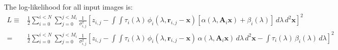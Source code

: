 \documentclass[DM,authoryear,toc]{lsstdoc}
\begin{document}
The log-likelihood for all input images is:
\begin{align}
L \equiv &
    \frac{1}{2} \sum_{i=0}^{i<N} \sum_{j=0}^{j<M_i}
        \frac{1}{\sigma_{i,j}^2}
        \left[
            z_{i,j}
            - \int\!\!\!\!\int\!
                \tau_i(\lambda)
                \, \phi_i(\lambda, \bm{r}_{i,j} - \bm{x})
                \left[
                    \alpha(\lambda, \bm{A}_i\bm{x})
                    + \beta_i(\lambda)
                \right]
                \, d\lambda \, d^2\bm{x}
        \right]^2 \\
=&
    \frac{1}{2} \sum_{i=0}^{i<N} \sum_{j=0}^{j<M_i}
        \frac{1}{\sigma_{i,j}^2}
        \left[
            z_{i,j}
            - \int\!\!\!\!\int\!
                \tau_i(\lambda)
                \, \phi_i(\lambda, \bm{r}_{i,j} - \bm{x})
                \, \alpha(\lambda, \bm{A}_i\bm{x})
                \, d\lambda \, d^2\bm{x}
            - \int\!
                \tau_i(\lambda)\,
                \beta_i(\lambda)
                \, d\lambda
        \right]^2 \\
\end{align}



\end{document}
